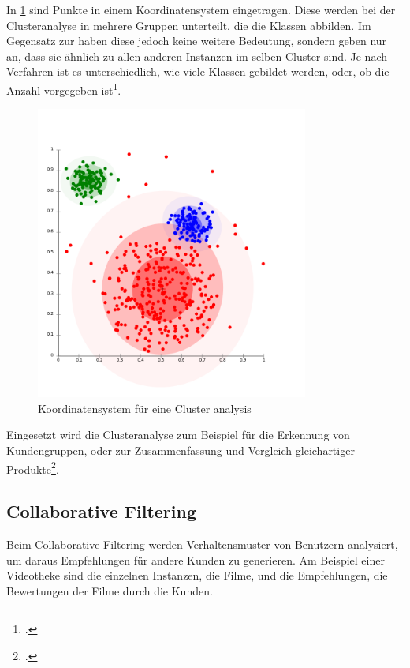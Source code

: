 In \cref{fig:recherche:dataminingtechniken:disziplinen:clusteranalysis} sind Punkte in einem Koordinatensystem eingetragen. Diese werden bei der Clusteranalyse in mehrere Gruppen unterteilt, die die Klassen abbilden. Im Gegensatz zur  haben diese jedoch keine weitere Bedeutung, sondern geben nur an, dass sie ähnlich zu allen anderen Instanzen im selben Cluster sind. Je nach Verfahren ist es unterschiedlich, wie viele Klassen gebildet werden, oder, ob die Anzahl vorgegeben ist\footcite{data_mining_concepts_and_techniques}.
\begin{figure}[H]
	\RawFloats
	\centering
	\includegraphics[width=0.8\textwidth]{images/clusteranalysis.png}
	\caption{Koordinatensystem für eine Cluster analysis}
	\label{fig:recherche:dataminingtechniken:disziplinen:clusteranalysis}
\end{figure}

Eingesetzt wird die Clusteranalyse zum Beispiel für die Erkennung von Kundengruppen, oder zur  Zusammenfassung und Vergleich gleichartiger Produkte\footcite{cluster_analysis_for_segmentation_2017-05-29}.


\subsection{Collaborative Filtering}
\label{sec:recherche:dataminingtechniken:disziplinen:collaborativefiltering}
Beim Collaborative Filtering werden Verhaltensmuster von Benutzern analysiert, um daraus Empfehlungen für andere Kunden zu generieren. Am Beispiel einer Videotheke sind die einzelnen Instanzen, die Filme, und die Empfehlungen, die Bewertungen der Filme durch die Kunden. 

